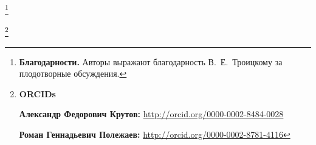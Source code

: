 \thanks{{\bf Благодарности.} Авторы выражают благодарность В.~Е.~Троицкому  за плодотворные обсуждения.

}



\thanks{{\bf ORCIDs}



{\bf Александр Федорович Крутов:} \url{http://orcid.org/0000-0002-8484-0028}



{\bf Роман Геннадьевич Полежаев:} \url{http://orcid.org/0000-0002-8781-4116}



}







\RusRef





